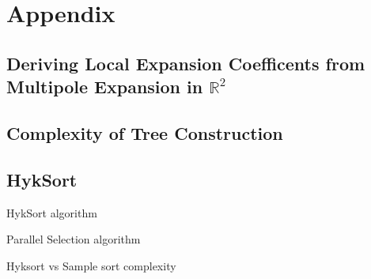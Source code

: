 \chapter{Appendix}

\section{Deriving Local Expansion Coefficents from Multipole Expansion in $\mathbb{R}^2$}\label{app:a_1_fmm_algorithm}

\section{Complexity of Tree Construction}\label{app:a_2_complexity_tree_construction}


\section{HykSort}\label{app:a_3:hyksort}

HykSort algorithm

Parallel Selection algorithm


Hyksort vs Sample sort complexity
